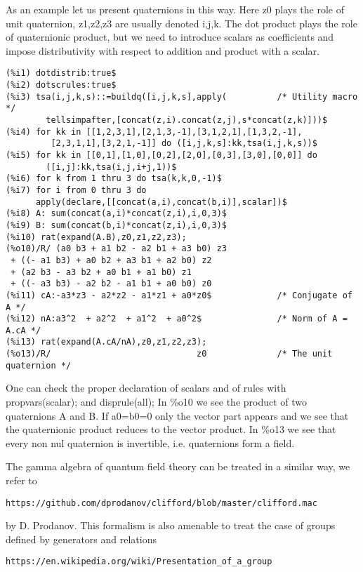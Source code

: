 \documentclass[a4paper,11pt]{article}
\begin{document}
As an example let us present quaternions in this way. Here z0 plays
the role of unit quaternion, z1,z2,z3 are usually denoted i,j,k. The
dot product plays the role of quaternionic product, but we need to
introduce scalars as coefficients and impose distributivity with
respect to addition and product with a scalar.
\newpage
\begin{verbatim}
(%i1) dotdistrib:true$
(%i2) dotscrules:true$
(%i3) tsa(i,j,k,s)::=buildq([i,j,k,s],apply(          /* Utility macro */
        tellsimpafter,[concat(z,i).concat(z,j),s*concat(z,k)]))$
(%i4) for kk in [[1,2,3,1],[2,1,3,-1],[3,1,2,1],[1,3,2,-1],
         [2,3,1,1],[3,2,1,-1]] do ([i,j,k,s]:kk,tsa(i,j,k,s))$
(%i5) for kk in [[0,1],[1,0],[0,2],[2,0],[0,3],[3,0],[0,0]] do
        ([i,j]:kk,tsa(i,j,i+j,1))$
(%i6) for k from 1 thru 3 do tsa(k,k,0,-1)$
(%i7) for i from 0 thru 3 do
      apply(declare,[[concat(a,i),concat(b,i)],scalar])$
(%i8) A: sum(concat(a,i)*concat(z,i),i,0,3)$
(%i9) B: sum(concat(b,i)*concat(z,i),i,0,3)$
(%i10) rat(expand(A.B),z0,z1,z2,z3);
(%o10)/R/ (a0 b3 + a1 b2 - a2 b1 + a3 b0) z3
 + ((- a1 b3) + a0 b2 + a3 b1 + a2 b0) z2 
 + (a2 b3 - a3 b2 + a0 b1 + a1 b0) z1
 + ((- a3 b3) - a2 b2 - a1 b1 + a0 b0) z0
(%i11) cA:-a3*z3 - a2*z2 - a1*z1 + a0*z0$             /* Conjugate of A */
(%i12) nA:a3^2  + a2^2  + a1^2  + a0^2$               /* Norm of A = A.cA */
(%i13) rat(expand(A.cA/nA),z0,z1,z2,z3);
(%o13)/R/                             z0              /* The unit quaternion */
\end{verbatim}
One can check the proper declaration of scalars and of rules with 
propvars(scalar);  and disprule(all);
In \%o10 we see the product of two quaternions A and B. If a0=b0=0 only the vector part
appears and we see that the quaternionic product reduces to the vector product.
In \%o13 we see that every non nul quaternion is invertible, i.e.
quaternions form a field. 

The gamma algebra of quantum field theory can be treated in a similar
way, we refer to
\begin{verbatim}
https://github.com/dprodanov/clifford/blob/master/clifford.mac
\end{verbatim}
by D. Prodanov.  This formalism is also amenable to treat the case of
groups defined by generators and relations
\begin{verbatim}
https://en.wikipedia.org/wiki/Presentation_of_a_group
\end{verbatim}
\end{document}
